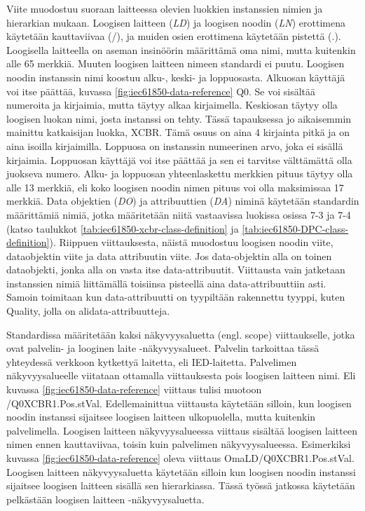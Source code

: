 Viite muodostuu suoraan laitteessa olevien luokkien instanssien nimien ja hierarkian mukaan. Loogisen laitteen (\emph{LD}) ja loogisen noodin (\emph{LN}) erottimena käytetään kauttaviivaa (/), ja muiden osien erottimena käytetään pistettä (.). Loogisella laitteella on aseman insinöörin määrittämä oma nimi, mutta kuitenkin alle 65 merkkiä. Muuten loogisen laitteen nimeen standardi ei puutu. Loogisen noodin instanssin nimi koostuu alku-, keski- ja loppuosasta. Alkuosan käyttäjä voi itse päättää, kuvassa \ref{fig:iec61850-data-reference} Q0. Se voi sisältää numeroita ja kirjaimia, mutta täytyy alkaa kirjaimella. Keskiosan täytyy olla loogisen luokan nimi, josta instanssi on tehty. Tässä tapauksessa jo aikaisemmin mainittu katkaisijan luokka, XCBR. Tämä osuus on aina 4 kirjainta pitkä ja on aina isoilla kirjaimilla. Loppuosa on instanssin numeerinen arvo, joka ei sisällä kirjaimia. Loppuosan käyttäjä voi itse päättää ja sen ei tarvitse välttämättä olla juokseva numero. Alku- ja loppuosan yhteenlaskettu merkkien pituus täytyy olla alle 13 merkkiä, eli koko loogisen noodin nimen pituus voi olla maksimissaa 17 merkkiä. Data objektien (\emph{DO}) ja attribuuttien (\emph{DA}) niminä käytetään standardin määrittämiä nimiä, jotka määritetään niitä vastaavissa luokissa osissa 7-3 ja 7-4 (katso taulukkot \ref{tab:iec61850-xcbr-class-definition} ja \ref{tab:iec61850-DPC-class-definition}). Riippuen viittauksesta, näistä muodostuu loogisen noodin viite, dataobjektin viite ja data attribuutin viite. Jos data-objektin alla on toinen dataobjekti, jonka alla on vasta itse data-attribuutit. Viittausta vain jatketaan instanssien nimiä liittämällä toisiinsa pisteellä aina data-attribuuttiin asti. Samoin toimitaan kun data-attribuutti on tyypiltään rakennettu tyyppi, kuten Quality, jolla on alidata-attribuutteja. \mbox{\cite[s.~181--182]{IEC61850-7-2}} \mbox{\cite[s.~93--95]{IEC61850-7-1}}

Standardissa määritetään kaksi näkyvyysaluetta (engl. scope) viittaukselle, jotka ovat palvelin- ja looginen laite -näkyvyysalueet. Palvelin tarkoittaa tässä yhteydessä verkkoon kytkettyä laitetta, eli IED-laitetta. Palvelimen näkyvyysalueelle viitataan ottamalla viittauksesta pois loogisen laitteen nimi. Eli kuvassa \ref{fig:iec61850-data-reference} viittaus tulisi muotoon /Q0XCBR1.\-Pos.\-stVal. Edellemainittua viittausta käytetään silloin, kun loogisen noodin instanssi sijaitsee loogisen laitteen ulkopuolella, mutta kuitenkin palvelimella. Loogisen laitteen näkyvyysalueessa viittaus sisältää loogisen laitteen nimen ennen kauttaviivaa, toisin kuin palvelimen näkyvyysalueessa. Esimerkiksi kuvassa \ref{fig:iec61850-data-reference} oleva viittaus OmaLD/\-Q0XCBR1.\-Pos.\-stVal. Loogisen laitteen näkyvyysaluetta käytetään silloin kun loogisen noodin instanssi sijaitsee loogisen laitteen sisällä sen hierarkiassa. Tässä työssä jatkossa käytetään pelkästään loogisen laitteen -näkyvyysaluetta. \mbox{\cite[s.~183]{IEC61850-7-2}}

